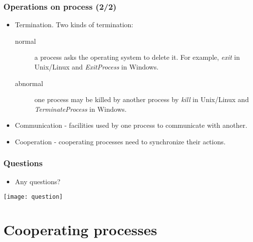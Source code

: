 \documentclass[CJKutf8,dvipsnames,table]{beamer}
\begin{document}
\begin{CJK*}{UTF8}{song}
  \begin{frame}
  \frametitle{Operations on process (2/2)} \pause
  \begin{itemize}
  \item Termination. \pause Two kinds of termination:  \pause
    \begin{description}
    \item[normal]{a process asks the operating system to delete it. For example, \emph{exit} in Unix/Linux and \emph{ExitProcess} in Windows.} \pause
    \item[abnormal]{one process may be killed by another process by \emph{kill} in Unix/Linux and \emph{TerminateProcess} in Windows.} \pause
    \end{description}
  \item Communication \pause - facilities used by one process to communicate with another.  \pause
  \item Cooperation \pause - cooperating processes need to synchronize their actions. 
  \end{itemize}
  \end{frame}

  \begin{frame}
  \frametitle{Questions}
  \begin{itemize}
  \item Any questions? 
  \end{itemize}
  \begin{center}
    \texttt{[image: question]}
  \end{center}
  \end{frame}

  \section{Cooperating processes}


\end{CJK*}
\end{document}
